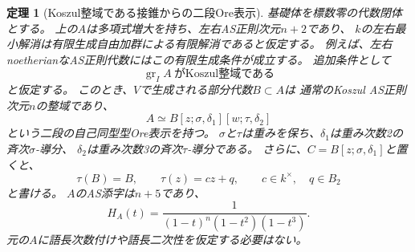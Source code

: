 \documentclass[11pt,a4paper]{ltjsarticle}
\newtheorem{theorem}{定理}[section]
\theoremstyle{definition}
\begin{document}
\begin{theorem}[Koszul整域である接錐からの二段Ore表示]
\label{thm:koszul-tangent-ore}
基礎体を標数零の代数閉体とする。
上の$A$は多項式増大を持ち、左右AS正則次元$n+2$であり、
$k$の左右最小解消は有限生成自由加群による有限解消であると仮定する。
例えば、左右noetherianなAS正則代数にはこの有限生成条件が成立する。
追加条件として
\[
 \operatorname{gr}_I A\ \text{がKoszul整域である}
\]
と仮定する。
このとき、$V$で生成される部分代数$B\subset A$は
通常のKoszul AS正則次元$n$の整域であり、
\[
 A\simeq B[z;\sigma,\delta_1][w;\tau,\delta_2]
\]
という二段の自己同型型Ore表示を持つ。
$\sigma$と$\tau$は重みを保ち、$\delta_1$は重み次数2の斉次$\sigma$-導分、
$\delta_2$は重み次数3の斉次$\tau$-導分である。
さらに、$C=B[z;\sigma,\delta_1]$と置くと、
\[
 \tau(B)=B,\qquad \tau(z)=cz+q,
 \qquad c\in k^\times,\quad q\in B_2
\]
と書ける。
$A$のAS添字は$n+5$であり、
\[
 H_A(t)=\frac1{(1-t)^n(1-t^2)(1-t^3)}.
\]
元の$A$に語長次数付けや語長二次性を仮定する必要はない。
\end{theorem}
\end{document}
